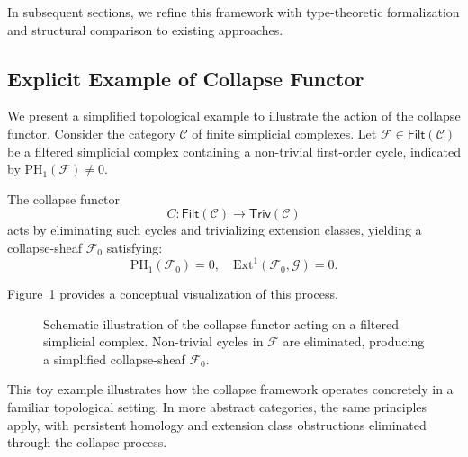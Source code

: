 \documentclass[11pt]{article}
\begin{document}
In subsequent sections, we refine this framework with type-theoretic formalization and structural comparison to existing approaches.


\subsection{Explicit Example of Collapse Functor}

We present a simplified topological example to illustrate the action of the collapse functor. Consider the category $\mathcal{C}$ of finite simplicial complexes. Let $\mathcal{F} \in \mathsf{Filt}(\mathcal{C})$ be a filtered simplicial complex containing a non-trivial first-order cycle, indicated by $\mathrm{PH}_1(\mathcal{F}) \neq 0$.

The collapse functor
\[
C : \mathsf{Filt}(\mathcal{C}) \longrightarrow \mathsf{Triv}(\mathcal{C})
\]
acts by eliminating such cycles and trivializing extension classes, yielding a collapse-sheaf $\mathcal{F}_0$ satisfying:
\[
\mathrm{PH}_1(\mathcal{F}_0) = 0, \quad \mathrm{Ext}^1(\mathcal{F}_0, \mathcal{G}) = 0.
\]

Figure~\ref{fig:collapse} provides a conceptual visualization of this process.

\begin{figure}[h]
\centering
{}
\caption{Schematic illustration of the collapse functor acting on a filtered simplicial complex. Non-trivial cycles in $\mathcal{F}$ are eliminated, producing a simplified collapse-sheaf $\mathcal{F}_0$.}
\label{fig:collapse}
\end{figure}

This toy example illustrates how the collapse framework operates concretely in a familiar topological setting. In more abstract categories, the same principles apply, with persistent homology and extension class obstructions eliminated through the collapse process.
\end{document}
